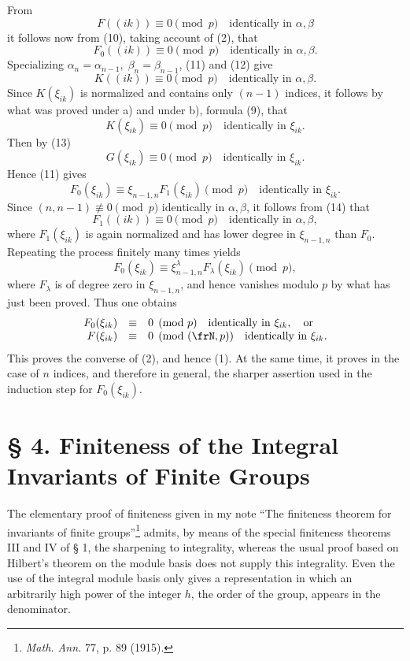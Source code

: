 \documentclass[11pt]{article}
\begin{document}
From
\[
        F((ik))\equiv0\pmod p\quad \text{identically in \(\alpha,\beta\)}
\]
it follows now from (10), taking account of (2), that
\begin{equation}
        F_0((ik))\equiv0\pmod p\quad \text{identically in \(\alpha,\beta\)}.
\end{equation}
Specializing \(\alpha_n=\alpha_{n-1},\;\beta_n=\beta_{n-1}\), (11) and (12) give
\begin{equation}
        K((ik))\equiv0\pmod p\quad \text{identically in \(\alpha,\beta\)}.
\end{equation}
Since \(K(\xi_{ik})\) is normalized and contains only \((n-1)\) indices, it follows by what was proved under a) and under b), formula (9), that
\[
        K(\xi_{ik})\equiv0\pmod p\quad \text{identically in \(\xi_{ik}\)}.
\]
Then by (13)
\[
        G(\xi_{ik})\equiv0\pmod p\quad \text{identically in \(\xi_{ik}\)}.
\]
Hence (11) gives
\[
        F_0(\xi_{ik})\equiv \xi_{n-1,n}F_1(\xi_{ik})\pmod p
        \quad \text{identically in \(\xi_{ik}\)}.
\]
Since \((n,n-1)\not\equiv0\pmod p\) identically in \(\alpha,\beta\), it follows from (14) that
\[
        F_1((ik))\equiv0\pmod p\quad \text{identically in \(\alpha,\beta\)},
\]
where \(F_1(\xi_{ik})\) is again normalized and has lower degree in \(\xi_{n-1,n}\) than \(F_0\). Repeating the process finitely many times yields
\[
        F_0(\xi_{ik})\equiv\xi_{n-1,n}^{\lambda}F_\lambda(\xi_{ik})\pmod p,
\]
where \(F_\lambda\) is of degree zero in \(\xi_{n-1,n}\), and hence vanishes modulo \(p\) by what has just been proved. Thus one obtains
\begin{equation}
\begin{array}{rcl}
        F_0(\xi_{ik})&\equiv&0\pmod p\quad \text{identically in \(\xi_{ik}\)},\quad\text{or}\\
        F(\xi_{ik})&\equiv&0\pmod{(\frN,p)}\quad \text{identically in \(\xi_{ik}\)}.
\end{array}
\end{equation}
This proves the converse of (2), and hence (1). At the same time, it proves in the case of \(n\) indices, and therefore in general, the sharper assertion used in the induction step for \(F_0(\xi_{ik})\).

\setcounter{equation}{0}
\section*{§ 4. Finiteness of the Integral Invariants of Finite Groups}

The elementary proof of finiteness given in my note ``The finiteness theorem for invariants of finite groups''\footnote{\emph{Math. Ann.} 77, p. 89 (1915).} admits, by means of the special finiteness theorems III and IV of § 1, the sharpening to integrality, whereas the usual proof based on Hilbert's theorem on the module basis does not supply this integrality. Even the use of the integral module basis only gives a representation in which an arbitrarily high power of the integer \(h\), the order of the group, appears in the denominator.
\end{document}
